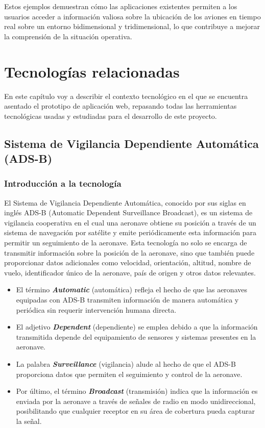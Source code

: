 \documentclass[a4paper, 11pt]{book}
\begin{document}
Estos ejemplos demuestran cómo las aplicaciones existentes permiten a los usuarios acceder a información valiosa sobre la ubicación de los aviones en tiempo real sobre un entorno bidimensional y tridimensional, lo que contribuye a mejorar la comprensión de la situación operativa.

\chapter{Tecnologías relacionadas}
\label{chap:tecnologias}
En este capítulo voy a describir el contexto tecnológico en el que se encuentra asentado el prototipo de aplicación web, repasando todas las herramientas tecnológicas usadas y estudiadas para el desarrollo de este proyecto.
\section{Sistema de Vigilancia Dependiente Automática (ADS-B)}
\label{sec:adsb}
\subsection{Introducción a la tecnología}
El Sistema de Vigilancia Dependiente Automática, conocido por sus siglas en inglés \textsc{ADS-B} (Automatic Dependent Surveillance Broadcast), es un sistema de vigilancia cooperativa en el cual una aeronave obtiene su posición a través de un sistema de navegación por satélite y emite periódicamente esta información para permitir un seguimiento de la aeronave.
Esta tecnología no solo se encarga de transmitir información sobre la posición de la aeronave, sino que también puede proporcionar datos adicionales como velocidad, orientación, altitud, nombre de vuelo, identificador único de la aeronave, país de origen y otros datos relevantes.
\begin{itemize}
	\item El término \textbf{\emph{Automatic}} (automática) refleja el hecho de que las aeronaves equipadas con \textsc{ADS-B} transmiten información de manera automática y periódica sin requerir intervención humana directa.
	\item El adjetivo \textbf{\emph{Dependent}} (dependiente) se emplea debido a que la información transmitida depende del equipamiento de sensores y sistemas presentes en la aeronave.
	\item La palabra \textbf{\emph{Surveillance}} (vigilancia) alude al hecho de que el \textsc{ADS-B} proporciona datos que permiten el seguimiento y control de la aeronave.
	\item Por último, el término\textbf{ \emph{Broadcast}} (transmisión) indica que la información es enviada por la aeronave a través de señales de radio en modo unidireccional, posibilitando que cualquier receptor en su área de cobertura pueda capturar la señal.
\end{itemize}
\end{document}
